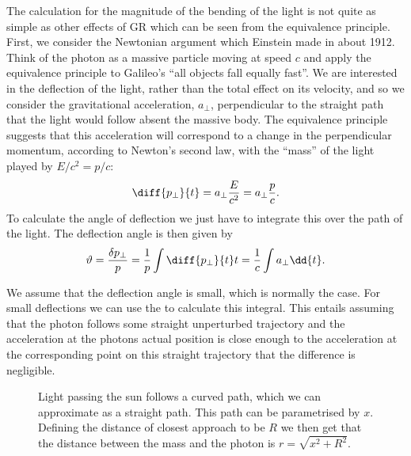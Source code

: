 \documentclass[fleqn]{NotesClass}
\begin{document}
    The calculation for the magnitude of the bending of the light is not quite as simple as other effects of GR which can be seen from the equivalence principle.
    First, we consider the Newtonian argument which Einstein made in about 1912.
    Think of the photon as a massive particle moving at speed \(c\) and apply the equivalence principle to Galileo's \enquote{all objects fall equally fast}.
    We are interested in the deflection of the light, rather than the total effect on its velocity, and so we consider the gravitational acceleration, \(a_{\perp}\), perpendicular to the straight path that the light would follow absent the massive body.
    The equivalence principle suggests that this acceleration will correspond to a change in the perpendicular momentum, according to Newton's second law, with the \enquote{mass} of the light played by \(E/c^2 = p/c\):
    \begin{equation}
        \diff{p_{\perp}}{t} = a_\perp \frac{E}{c^2} = a_{\perp} \frac{p}{c}.
    \end{equation}
    To calculate the angle of deflection we just have to integrate this over the path of the light.
    The deflection angle is then given by
    \begin{equation}
        \vartheta = \frac{\delta p_{\perp}}{p} = \frac{1}{p} \int \diff{p_{\perp}}{t}t = \frac{1}{c}\int a_{\perp} \dd{t}.
    \end{equation}
    
    We assume that the deflection angle is small, which is normally the case.
    For small deflections we can use the  to calculate this integral.
    This entails assuming that the photon follows some straight unperturbed trajectory and the acceleration at the photons actual position is close enough to the acceleration at the corresponding point on this straight trajectory that the difference is negligible.
    
    \begin{figure}
        \caption[Light bending around the sun.]{Light passing the sun follows a curved path, which we can approximate as a straight path. This path can be parametrised by \(x\). Defining the distance of closest approach to be \(R\) we then get that the distance between the mass and the photon is \(r = \sqrt{x^2 + R^2}\).}
    \end{figure}
    
\end{document}
